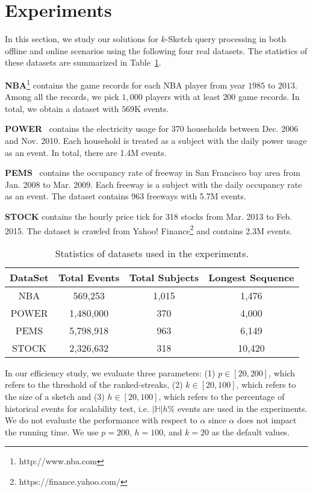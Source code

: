 \section{Experiments}\label{sec:experiment}
In this section, we study our solutions for $k$-Sketch query processing
in both offline and online scenarios using the following 
four real datasets. The statistics of these datasets are 
summarized in Table~\ref{tbl:dataset}.

\noindent\textbf{NBA}\footnote{http://www.nba.com} contains the game records for each NBA player from year $1985$ to $2013$. Among all the records, we pick $1,000$ players with at least $200$ game records. In total, we obtain a dataset with $569$K events.

\noindent\textbf{POWER}~\cite{Lichman2013} contains the electricity usage for 370 households between Dec. 2006 and Nov. 2010. Each household is treated as a subject with the daily power usage as an event. In total, there are 1.4M events.

\noindent\textbf{PEMS}~\cite{choe2002freeway} contains the occupancy rate of freeway in San Francisco bay area from Jan. 2008 to Mar. 2009. Each freeway is a subject with the daily occupancy rate as an event. The dataset contains 963 freeways with 5.7M events.

\noindent\textbf{STOCK} contains the hourly price tick for 318 stocks from Mar. 2013 to Feb. 2015.
The dataset is crawled from Yahoo! Finance\footnote{https://finance.yahoo.com/} and contains 2.3M events.

 
\begin{table}[h]
\caption{Statistics of datasets used in the experiments.}
\centering
\begin{tabular}{|c|c|c|c|}
\hline
DataSet & Total Events & Total Subjects  & Longest Sequence \\
\hline
NBA & 569,253 & 1,015&  1,476 \\
\hline
POWER & 1,480,000 & 370 & 4,000 \\
\hline
PEMS & 5,798,918 & 963&  6,149 \\
\hline
STOCK & 2,326,632 & 318&  10,420 \\
\hline
\end{tabular}
\label{tbl:dataset}
\end{table}

In our efficiency study, we evaluate three parameters: (1) $p\in[20,200]$, which refers to the threshold of the ranked-streaks, (2) $k\in[20,100]$, which refers to the size of a sketch and (3) $h\in[20,100]$, which refers to the percentage of historical events for scalability test, i.e. $|\mathbb{H}|h\%$ events are used in the experiments. We do not evaluate the performance with respect to $\alpha$ since $\alpha$ does not impact the running time. We use $p=200$, $h=100$, and $k=20$ as the default values.

